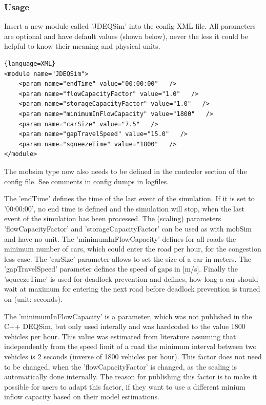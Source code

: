 \subsubsection{Usage}

Insert  a new module called 'JDEQSim' into the config XML file. All parameters  are optional and have default values (shown below), never the less it  could be helpful to know their meaning and physical units.
\begin{lstlisting}{language=XML}
<module name="JDEQSim">
    <param name="endTime" value="00:00:00"   />
    <param name="flowCapacityFactor" value="1.0"   />
    <param name="storageCapacityFactor" value="1.0"   />
    <param name="minimumInFlowCapacity" value="1800"   />
    <param name="carSize" value="7.5"   />
    <param name="gapTravelSpeed" value="15.0"   />
    <param name="squeezeTime" value="1800"   />
</module>
\end{lstlisting}

The mobsim type now  also needs to be defined in the controler section of the config  file. See comments in config dumps in logfiles.

The  'endTime' defines the time of the last event of the simulation. If it is  set to '00:00:00', no end time is defined and the simulation will stop,  when the last event of the simulation has been processed. The (scaling)  parameters  'flowCapacityFactor' and 'storageCapacityFactor' can  be used as with mobSim and have no unit. The 'minimumInFlowCapacity'  defines for all roads the minimum number of cars, which could enter the  road per hour, for the congestion less case. The 'carSize' parameter  allows to set the size of a car in meters. The 'gapTravelSpeed'  parameter defines the speed of gaps in [m/s]. Finally the 'squeezeTime'  is used for deadlock prevention and defines, how long a car should wait  at maximum for entering the next road before deadlock prevention is  turned on (unit: seconds).

The 'minimumInFlowCapacity' is a  parameter, which was not published in the C++ DEQSim, but only used  interally and was hardcoded to the value 1800 vehicles per hour. This  value was estimated from literature assuming that independently from the  speed limit of a road the minimum interval between two vehicles is 2  seconds (inverse of 1800 vehicles per hour). This factor does not need  to be changed, when the 'flowCapacityFactor' is changed, as the scaling  is automatically done internally. The reason for publishing this factor  is to make it possible for users to adapt this factor, if they want to  use a different minium inflow capacity based on their model estimations.

